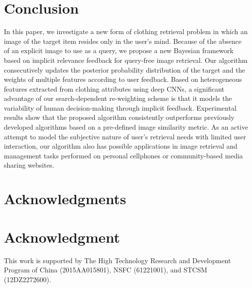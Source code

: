 \documentclass[journal]{IEEEtran}
\begin{document}
\section{Conclusion}
\label{sec::conclusion}
In this paper, we investigate a new form of clothing retrieval problem in which an image of the target item resides only in the user's mind. Because of the absence of an explicit image to use as a query, we propose a new Bayesian framework based on implicit relevance feedback for query-free image retrieval. Our algorithm consecutively updates the posterior probability distribution of the target and the weights of multiple features according to user feedback. Based on heterogeneous features extracted from clothing attributes using deep CNNs, a significant advantage of our search-dependent re-weighting scheme is that it models the variability of human decision-making through implicit feedback. Experimental results show that the proposed algorithm consistently outperforms previously developed algorithms based on a pre-defined image similarity metric. As an active attempt to model the subjective nature of user's retrieval needs with limited user interaction, our algorithm also has possible applications in image retrieval and management tasks performed on personal cellphones or community-based media sharing websites.




\ifCLASSOPTIONcompsoc
\section*{Acknowledgments}
\else
\section*{Acknowledgment}
\fi This work is supported by The High Technology Research and
Development Program of China (2015AA015801), NSFC (61221001), and
STCSM (12DZ2272600).



\ifCLASSOPTIONcaptionsoff
  \newpage
\fi




\end{document}
